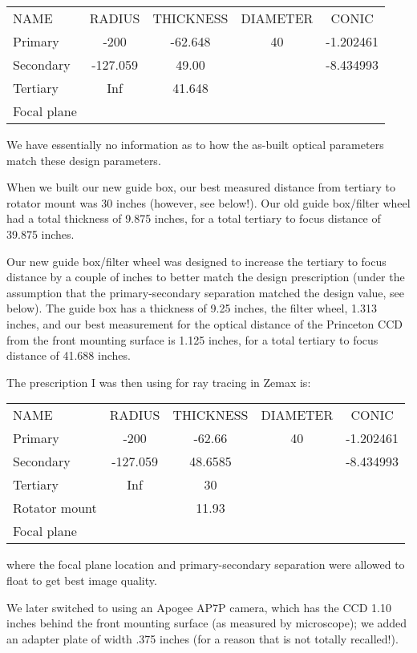 \documentclass{article}[12pt]
\begin{document}
\begin{itemize}
\begin{center}
\begin{tabular}{lcccc}
NAME & RADIUS & THICKNESS & DIAMETER & CONIC \\
Primary & -200 & -62.648 & 40 & -1.202461 \\
Secondary & -127.059 & 49.00 & & -8.434993 \\
Tertiary & Inf & 41.648 & & \\
Focal plane & & & 
\end{tabular}
\end{center}

We have essentially no information as to how the as-built
optical parameters match these design parameters.

When we built our new guide box, our best measured distance from tertiary 
to rotator mount was 30 inches (however, see below!).
Our old guide box/filter wheel had a total thickness of 9.875 inches, for
a total tertiary to focus distance of 39.875 inches.

Our new guide box/filter wheel was designed to increase the tertiary to
focus distance by a couple of inches to better match the design 
prescription (under the assumption that the primary-secondary separation
matched the design value, see below). The guide box has a thickness of
9.25 inches, the filter wheel, 1.313 inches, and our best measurement
for the optical distance of the Princeton CCD from the front mounting surface is
1.125 inches, for a total tertiary to focus distance of 41.688 inches.

The prescription I was then using for ray tracing in Zemax is:

\begin{center}
\begin{tabular}{lcccc}
NAME & RADIUS & THICKNESS & DIAMETER & CONIC \\
Primary & -200 & -62.66 & 40 & -1.202461 \\
Secondary & -127.059 & 48.6585 & & -8.434993 \\
Tertiary & Inf & 30 & & \\
Rotator mount & & 11.93 & \\
Focal plane & & & 
\end{tabular}
\end{center}

where the focal plane location and primary-secondary separation were 
allowed to float to get best image quality.

We later switched to using an Apogee AP7P camera, which has the CCD 
1.10 inches behind the front mounting surface (as measured by microscope);
we added an adapter plate of width .375 inches (for a reason that
is not totally recalled!).


\end{itemize}
\end{document}
